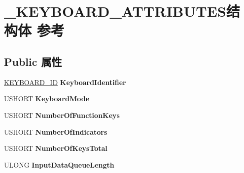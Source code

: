 \hypertarget{struct___k_e_y_b_o_a_r_d___a_t_t_r_i_b_u_t_e_s}{}\section{\+\_\+\+K\+E\+Y\+B\+O\+A\+R\+D\+\_\+\+A\+T\+T\+R\+I\+B\+U\+T\+E\+S结构体 参考}
\label{struct___k_e_y_b_o_a_r_d___a_t_t_r_i_b_u_t_e_s}
\subsection*{Public 属性}
\begin{DoxyCompactItemize}
\item 
\mbox{\label{struct___k_e_y_b_o_a_r_d___a_t_t_r_i_b_u_t_e_s_a28ca6ccedacc9cdc4699165f64380f13}} 
\hyperlink{struct___k_e_y_b_o_a_r_d___i_d}{K\+E\+Y\+B\+O\+A\+R\+D\+\_\+\+ID} {\bfseries Keyboard\+Identifier}
\item 
\mbox{\label{struct___k_e_y_b_o_a_r_d___a_t_t_r_i_b_u_t_e_s_a5720b6454a2eb79b5e7aa123f3cffca7}} 
U\+S\+H\+O\+RT {\bfseries Keyboard\+Mode}
\item 
\mbox{\label{struct___k_e_y_b_o_a_r_d___a_t_t_r_i_b_u_t_e_s_ad4101822cc7dbe1ff69389a45ec4fc09}} 
U\+S\+H\+O\+RT {\bfseries Number\+Of\+Function\+Keys}
\item 
\mbox{\label{struct___k_e_y_b_o_a_r_d___a_t_t_r_i_b_u_t_e_s_a991ffea5c5153d603633c0422180b347}} 
U\+S\+H\+O\+RT {\bfseries Number\+Of\+Indicators}
\item 
\mbox{\label{struct___k_e_y_b_o_a_r_d___a_t_t_r_i_b_u_t_e_s_a8df3f1bed356a14305475ecef18d0af2}} 
U\+S\+H\+O\+RT {\bfseries Number\+Of\+Keys\+Total}
\item 
\mbox{\label{struct___k_e_y_b_o_a_r_d___a_t_t_r_i_b_u_t_e_s_a3d803cc7cf2f78b0c39bdab570ec87b3}} 
U\+L\+O\+NG {\bfseries Input\+Data\+Queue\+Length}
\item 
\mbox{\label{struct___k_e_y_b_o_a_r_d___a_t_t_r_i_b_u_t_e_s_acb53058319bac0f2e1c1efd54ec2f7dd}} 

\end{DoxyCompactItemize}
